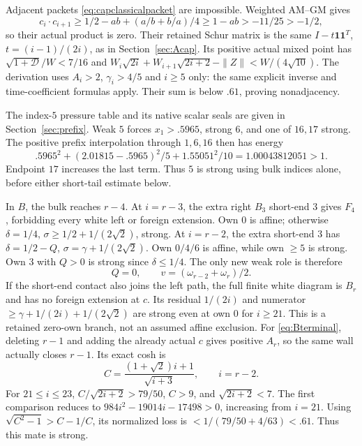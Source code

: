 \documentclass[11pt]{article}
\theoremstyle{remark}
\begin{document}
Adjacent packets \eqref{eq:capclassicalpacket} are impossible.
Weighted AM--GM gives
\[
 c_i\cdot c_{i+1}\ge1/2-ab+(a/b+b/a)/4
             \ge1-ab>-11/25>-1/2,
\]
so their actual product is zero. Their retained Schur matrix is the
same $I-t\mathbf1\mathbf1^T$, $t=(i-1)/(2i)$, as in
Section~\ref{sec:Acap}. Its positive actual mixed point has
$\sqrt{1+\mathcal D}/W<7/16$ and
$W_i\sqrt{2i}+W_{i+1}\sqrt{2i+2}-\|Z\|<W/(4\sqrt{10})$.
The derivation uses $A_i>2$, $\gamma_i>4/5$ and $i\ge5$ only:
the same explicit inverse and time-coefficient formulas apply.
Their sum is below $.61$, proving nonadjacency.

The index-$5$ pressure table and its native scalar seals are given
in Section~\ref{sec:prefix}. Weak $5$ forces $x_1>.5965$, strong
$6$, and one of $16,17$ strong. The positive prefix interpolation
through $1,6,16$ then has energy
\begin{equation}\label{eq:capbootstrap}
 .5965^2+(2.01815-.5965)^2/5+1.55051^2/10
       =1.00043812051>1.
\end{equation}
Endpoint $17$ increases the last term. Thus $5$ is strong using
bulk indices alone, before either short-tail estimate below.

In $B$, the bulk reaches $r-4$. At $i=r-3$, the extra right $B_3$
short-end $3$ gives $F_4$, forbidding every white left or foreign
extension. Own $0$ is affine; otherwise
$\delta=1/4$, $\sigma\ge1/2+1/(2\sqrt2)$, strong.
At $i=r-2$, the extra short-end $3$ has
$\delta=1/2-Q$, $\sigma=\gamma+1/(2\sqrt2)$.
Own $0/4/6$ is affine, while own $\ge5$ is strong.
Own $3$ with $Q>0$ is strong since $\delta\le1/4$.
The only new weak role is therefore
\begin{equation}\label{eq:Bterminal}
 Q=0,\qquad v=(\omega_{r-2}+\omega_r)/2.
\end{equation}
If the short-end contact also joins the left path, the full finite
white diagram is $B_r$ and has no foreign extension at $c$.
Its residual $1/(2i)$ and numerator
$\ge\gamma+1/(2i)+1/(2\sqrt2)$ are strong even at own $0$
for $i\ge21$. This is a retained zero-own branch, not an assumed
affine exclusion.
For \eqref{eq:Bterminal}, deleting $r-1$ and adding the already
actual $c$ gives positive $A_r$, so the same wall actually closes
$r-1$. Its exact cosh is
\[
 C=\frac{(1+\sqrt2)i+1}{\sqrt{i+3}},\qquad i=r-2.
\]
For $21\le i\le23$, $C/\sqrt{2i+2}>79/50$, $C>9$, and
$\sqrt{2i+2}<7$. The first comparison reduces to
$984i^2-19014i-17498>0$, increasing from $i=21$.
Using $\sqrt{C^2-1}>C-1/C$, its normalized loss is
$<1/(79/50+4/63)<.61$. Thus this mate is strong.
\end{document}
